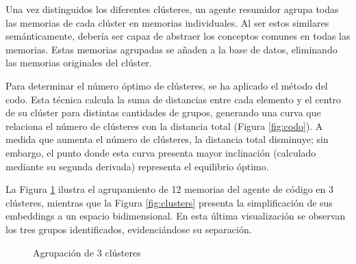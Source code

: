 Una vez distinguidos los diferentes clústeres, un agente resumidor agrupa todas las memorias de cada clúster en memorias individuales. Al ser estos similares semánticamente, debería ser capaz de abstraer los conceptos comunes en todas las memorias. Estas memorias agrupadas se añaden a la base de datos, eliminando las memorias originales del clúster.

Para determinar el número óptimo de clústeres, se ha aplicado el método del codo. Esta técnica calcula la suma de distancias entre cada elemento y el centro de su clúster para distintas cantidades de grupos, generando una curva que relaciona el número de clústeres con la distancia total (Figura \ref{fig:codo}). A medida que aumenta el número de clústeres, la distancia total disminuye; sin embargo, el punto donde esta curva presenta mayor inclinación (calculado mediante su segunda derivada) representa el equilibrio óptimo.

La Figura \ref{fig:clustering-analysis} ilustra el agrupamiento de 12 memorias del agente de código en 3 clústeres, mientras que la Figura \ref{fig:clusters} presenta la simplificación de sus embeddings a un espacio bidimensional. En esta última visualización se observan los tres grupos identificados, evidenciándose su separación.

\begin{figure}[h]
\centering
{}
\caption{Agrupación de 3 clústeres}
\label{fig:clustering-analysis}
\end{figure}

